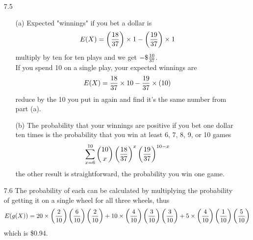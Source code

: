 \documentclass[english, 11pt]{article}
\begin{document}
\begin{itemize}
  \item[7.5]
  \begin{itemize}
    \item[(a)] Expected "winnings" if you bet a dollar is
    \[ E(X) = \left( \frac{18}{37} \right)\times 1 - \left( \frac{19}{37} \right)\times 1 \]
    multiply by ten for ten plays and we get $-\$\frac{10}{37}$. \\
    If you spend 10 on a single play, your expected winnings are
    \[ E(X) = \frac{18}{37}\times10 - \frac{19}{37}\times(10)\]
    reduce by the 10 you put in again and find it's the same number from part (a).
    \item[(b)] The probability that your winnings are positive if you bet one dollar ten times is the probability that you win at least 6, 7, 8, 9, or 10 games
    \[ \sum_{x = 6}^{10} {10 \choose x} \left( \frac{18}{37} \right)^x \left( \frac{19}{37} \right)^{10 -x} \]
    the other result is straightforward, the probability you win one game.
  \end{itemize}

  \item[7.6] The probability of each can be calculated by multiplying the probability of getting it on a single wheel for all three wheels, thus
  \[ E(g(X)) = 20\times \left( \frac{2}{10} \right)\left( \frac{6}{10} \right)\left( \frac{2}{10} \right)
               + 10\times \left( \frac{4}{10} \right)\left( \frac{3}{10} \right)\left( \frac{3}{10} \right)
               + 5\times \left( \frac{4}{10} \right)\left( \frac{1}{10} \right)\left( \frac{5}{10} \right)\]
               which is \$0.94.


\end{itemize}
\end{document}
